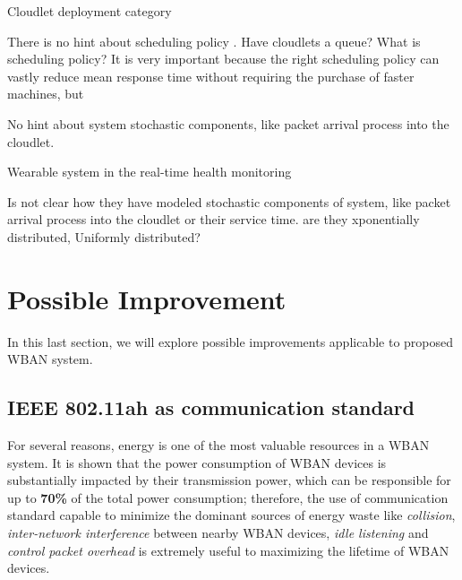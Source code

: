 \documentclass[sigchi]{acmart}
\begin{document}
Cloudlet deployment category 

There is no hint about scheduling policy . Have cloudlets a queue? What is scheduling policy? It is very important because the right scheduling policy can vastly reduce
mean response time without requiring the purchase of faster machines, but 





No hint about system stochastic components, like packet arrival process into the cloudlet.





Wearable system in the real-time health monitoring



Is not clear how they have modeled stochastic components of system, like packet arrival process into the cloudlet or their service time.
are they xponentially distributed, Uniformly distributed?





























\section{Possible Improvement}

In this last section, we will explore possible improvements applicable to \citep{MSAReport} proposed WBAN system.

\subsection{IEEE 802.11ah as communication standard}

For several reasons, energy is one of the most valuable resources in a WBAN system. It is shown that the power consumption of WBAN devices is substantially impacted by their transmission power, which can be responsible for up to \textbf{70\%} of the total power consumption; therefore, the use of communication standard capable to minimize the dominant sources of energy waste like \textit{collision}, \textit{inter-network interference} between nearby WBAN devices, \textit{idle listening} and \textit{control packet overhead} is extremely useful to maximizing the lifetime of WBAN devices.
\end{document}
